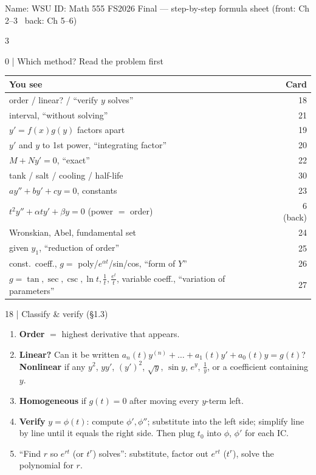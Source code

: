 \documentclass[8pt]{extarticle}
\newcommand{\key}[1]{\textcolor{grn}{\textbf{#1}}}
\begin{document}
\fontsize{6.5}{7.25}\selectfont
{\fontsize{7.5}{8.5}\selectfont Name: \underline{\hspace{1.6in}} \; WSU ID: \underline{\hspace{1.1in}} \hfill Math 555 FS2026 Final --- step-by-step formula sheet (front: Ch 2--3 \textperiodcentered\ back: Ch 5--6)}\par\vspace{0.5pt}
\begin{multicols*}{3}
\raggedcolumns

\begin{card}{0 \;|\; Which method? Read the problem first}
\renewcommand{\arraystretch}{1.05}
\begin{tabular}{@{}>{\raggedright\arraybackslash}p{\dimexpr\linewidth-0.42in}@{\;}r@{}}
\textbf{You see} & \textbf{Card}\\\hline
order / linear? / ``verify $y$ solves'' & 18\\
interval, ``without solving'' & 21\\
$y'=f(x)g(y)$ factors apart & 19\\
$y'$ and $y$ to 1st power, ``integrating factor'' & 20\\
$M+Ny'=0$, ``exact'' & 22\\
tank / salt / cooling / half-life & 30\\
$ay''+by'+cy=0$, constants & 23\\
$t^2y''+\alpha ty'+\beta y=0$ (power $=$ order) & 6 (back)\\
Wronskian, Abel, fundamental set & 24\\
given $y_1$, ``reduction of order'' & 25\\
const.\ coeff., $g=$ poly/$e^{\alpha t}$/sin/cos, ``form of $Y$'' & 26\\
$g=\tan,\sec,\csc,\ln t,\frac1t,\frac{e^t}{t}$, variable coeff., ``variation of parameters'' & 27
\end{tabular}
\end{card}

\begin{card}{18 \;|\; Classify \& verify (\S1.3)}
\begin{enumerate}
\item \key{Order} $=$ highest derivative that appears.
\item \key{Linear?} Can it be written $a_n(t)y^{(n)}+\dots+a_1(t)y'+a_0(t)y=g(t)$? \textbf{Nonlinear} if any $y^2$, $yy'$, $(y')^2$, $\sqrt y$, $\sin y$, $e^y$, $\frac1y$, or a coefficient containing $y$.
\item \key{Homogeneous} if $g(t)=0$ after moving every $y$-term left.
\item \key{Verify} $y=\phi(t)$: compute $\phi',\phi''$; substitute into the left side; simplify line by line until it equals the right side. Then plug $t_0$ into $\phi$, $\phi'$ for each IC.
\item ``Find $r$ so $e^{rt}$ (or $t^r$) solves'': substitute, factor out $e^{rt}$ ($t^r$), solve the polynomial for $r$.
\end{enumerate}
\end{card}


\end{multicols*}
\end{document}
